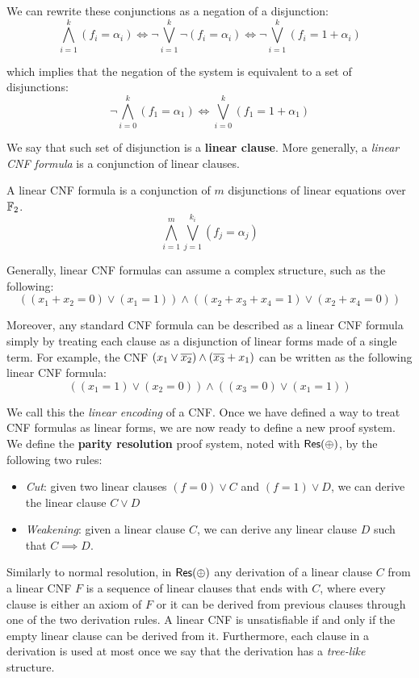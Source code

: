 We can rewrite these conjunctions as a negation of a disjunction:
\[\bigwedge_{i = 1}^k (f_i = \alpha_i) \iff \lnot \bigvee_{i = 1}^k \lnot (f_i = \alpha_i) \iff \lnot \bigvee_{i = 1}^k (f_i = 1 + \alpha_i)\]

which implies that the negation of the system is equivalent to a set of disjunctions:
\[\lnot \bigwedge_{i = 0}^k (f_1 = \alpha_1) \iff \bigvee_{i = 0}^k (f_1 = 1 + \alpha_1)\]

We say that such set of disjunction is a \textbf{linear clause}. More generally, a \textit{linear CNF formula} is a conjunction of linear clauses.

\begin{definition}
    A linear CNF formula is a conjunction of $m$ disjunctions of linear equations over $\mathbb{F}_2$.
    \[\bigwedge_{i = 1}^m \bigvee_{j = 1}^{k_i} (f_j = \alpha_j)\]
\end{definition}

Generally, linear CNF formulas can assume a complex structure, such as the following:
\[((x_1+x_2 = 0) \lor (x_1 = 1)) \land ((x_2 + x_3 + x_4 = 1) \lor (x_2 + x_4 = 0))\]

Moreover, any standard CNF formula can be described as a linear CNF formula simply by treating each clause as a disjunction of linear forms made of a single term. For example, the CNF $(x_1 \lor \overline{x_2}) \land (\overline{x_3} + x_1)$ can be written as the following linear CNF formula:
\[((x_1 = 1) \lor (x_2 = 0)) \land ((x_3 = 0) \lor (x_1 = 1))\]

We call this the \textit{linear encoding} of a CNF. Once we have defined a way to treat CNF formulas as linear forms, we are now ready to define a new proof system. We define the \textbf{parity resolution} proof system, noted with $\mathsf{Res(\oplus)}$, by the following two rules:
\begin{itemize}
    \item \textit{Cut}: given two linear clauses $(f = 0) \lor C$ and $(f = 1) \lor D$, we can derive the linear clause $C \lor D$
    \item \textit{Weakening}: given a linear clause $C$, we can derive any linear clause $D$ such that $C \implies D$.
\end{itemize}

Similarly to normal resolution, in $\mathsf{Res(\oplus)}$ any derivation of a linear clause $C$ from a linear CNF $F$ is a sequence of linear clauses that ends with $C$, where every clause is either an axiom of $F$ or it can be derived from previous clauses through one of the two derivation rules. A linear CNF is unsatisfiable if and only if the empty linear clause can be derived from it.
Furthermore, each clause in a derivation is used at most once we say that the derivation has a \textit{tree-like} structure.

